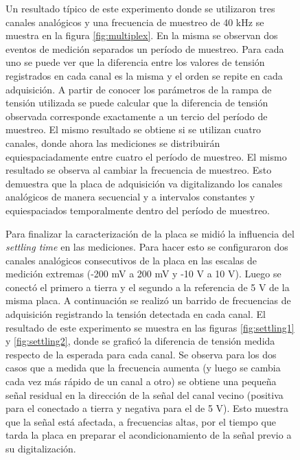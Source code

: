 \documentclass[a4paper,11pt]{article}
\begin{document}
\begin{figure}[!ht]
Un resultado típico de este experimento donde se utilizaron tres canales analógicos y una frecuencia de muestreo de 40 kHz se muestra en la figura \ref{fig:multiplex}. En la misma se observan dos eventos de medición separados un período de muestreo. Para cada uno se puede ver que la diferencia entre los valores de tensión registrados en cada canal es la misma y el orden se repite en cada adquisición. A partir de conocer los parámetros de la rampa de tensión utilizada se puede calcular que la diferencia de tensión observada corresponde exactamente a un tercio del período de muestreo. El mismo resultado se obtiene si se utilizan cuatro canales, donde ahora las mediciones se distribuirán equiespaciadamente entre cuatro el período de muestreo. El mismo resultado se observa al cambiar la frecuencia de muestreo. Esto demuestra que la placa de adquisición va digitalizando los canales analógicos de manera secuencial y a intervalos constantes y equiespaciados temporalmente dentro del período de muestreo.

Para finalizar la caracterización de la placa se midió la influencia del \textit{settling time} en las mediciones. Para hacer esto se configuraron dos canales analógicos consecutivos de la placa en las escalas de medición extremas (-200 mV a 200 mV y -10 V a 10 V). Luego se conectó el primero a tierra y el segundo a la referencia de 5 V de la misma placa. A continuación se realizó un barrido de frecuencias de adquisición registrando la tensión detectada en cada canal. El resultado de este experimento se muestra en las figuras \ref{fig:settling1} y \ref{fig:settling2}, donde se graficó la diferencia de tensión medida respecto de la esperada para cada canal. Se observa para los dos casos que a medida que la frecuencia aumenta (y luego se cambia cada vez más rápido de un canal a otro) se obtiene una pequeña señal residual en la dirección de la señal del canal vecino (positiva para el conectado a tierra y negativa para el de 5 V). Esto muestra que la señal está afectada, a frecuencias altas, por el tiempo que tarda la placa en preparar el acondicionamiento de la señal previo a su digitalización.  


\end{figure}
\end{document}
